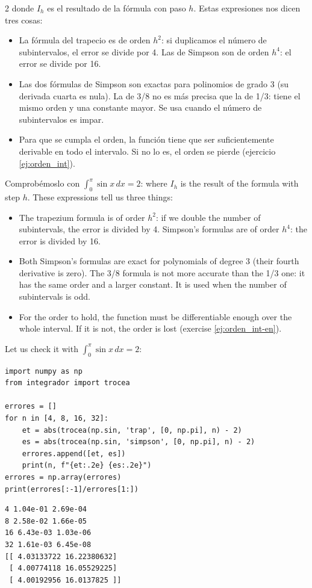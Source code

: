 \begin{paracol}{2}
donde $I_h$ es el resultado de la fórmula con paso $h$. Estas expresiones nos dicen tres cosas:
\begin{itemize}
\item La fórmula del trapecio es de orden $h^2$: si duplicamos el número de subintervalos, el error se divide por 4. Las de Simpson son de orden $h^4$: el error se divide por 16.
\item Las dos fórmulas de Simpson son exactas para polinomios de grado 3 (su derivada cuarta es nula). La de 3/8 no es más precisa que la de 1/3: tiene el mismo orden y una constante mayor. Se usa cuando el número de subintervalos es impar.
\item Para que se cumpla el orden, la función tiene que ser suficientemente derivable en todo el intervalo. Si no lo es, el orden se pierde (ejercicio \ref{ej:orden_int}).
\end{itemize}
Comprobémoslo con $\int_0^\pi\sin x\,dx=2$:
\switchcolumn
where $I_h$ is the result of the formula with step $h$. These expressions tell us three things:
\begin{itemize}
\item The trapezium formula is of order $h^2$: if we double the number of subintervals, the error is divided by 4. Simpson's formulas are of order $h^4$: the error is divided by 16.
\item Both Simpson's formulas are exact for polynomials of degree 3 (their fourth derivative is zero). The 3/8 formula is not more accurate than the 1/3 one: it has the same order and a larger constant. It is used when the number of subintervals is odd.
\item For the order to hold, the function must be differentiable enough over the whole interval. If it is not, the order is lost (exercise \ref{ej:orden_int-en}).
\end{itemize}
Let us check it with $\int_0^\pi\sin x\,dx=2$:
\end{paracol}
\begin{verbatim}
import numpy as np
from integrador import trocea

errores = []
for n in [4, 8, 16, 32]:
    et = abs(trocea(np.sin, 'trap', [0, np.pi], n) - 2)
    es = abs(trocea(np.sin, 'simpson', [0, np.pi], n) - 2)
    errores.append([et, es])
    print(n, f"{et:.2e} {es:.2e}")
errores = np.array(errores)
print(errores[:-1]/errores[1:])
\end{verbatim}
\begin{verbatim}
4 1.04e-01 2.69e-04
8 2.58e-02 1.66e-05
16 6.43e-03 1.03e-06
32 1.61e-03 6.45e-08
[[ 4.03133722 16.22380632]
 [ 4.00774118 16.05529225]
 [ 4.00192956 16.0137825 ]]
\end{verbatim}
